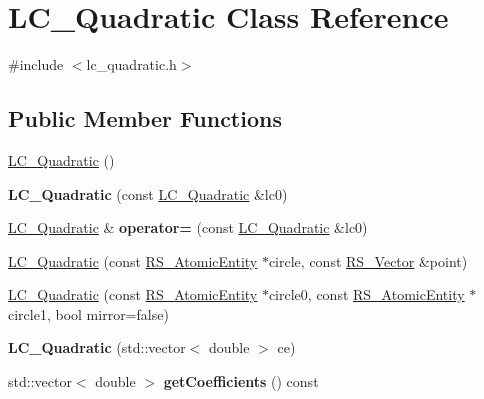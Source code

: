 \hypertarget{classLC__Quadratic}{\section{L\-C\-\_\-\-Quadratic Class Reference}
\label{classLC__Quadratic}
}


{\ttfamily \#include $<$lc\-\_\-quadratic.\-h$>$}

\subsection*{Public Member Functions}
\begin{DoxyCompactItemize}
\item 
\hyperlink{classLC__Quadratic_a3f76768a3e40df14b4e495219dd2ee09}{L\-C\-\_\-\-Quadratic} ()
\item 
\hypertarget{classLC__Quadratic_afc73fea931c40aa1b7277de86ac136b8}{{\bfseries L\-C\-\_\-\-Quadratic} (const \hyperlink{classLC__Quadratic}{L\-C\-\_\-\-Quadratic} \&lc0)}\label{classLC__Quadratic_afc73fea931c40aa1b7277de86ac136b8}

\item 
\hypertarget{classLC__Quadratic_afee130a8cc00c41f72e1bfdf98d4afe4}{\hyperlink{classLC__Quadratic}{L\-C\-\_\-\-Quadratic} \& {\bfseries operator=} (const \hyperlink{classLC__Quadratic}{L\-C\-\_\-\-Quadratic} \&lc0)}\label{classLC__Quadratic_afee130a8cc00c41f72e1bfdf98d4afe4}

\item 
\hyperlink{classLC__Quadratic_aa418f98f97745e37df1420d4cec12a3f}{L\-C\-\_\-\-Quadratic} (const \hyperlink{classRS__AtomicEntity}{R\-S\-\_\-\-Atomic\-Entity} $\ast$circle, const \hyperlink{classRS__Vector}{R\-S\-\_\-\-Vector} \&point)
\item 
\hyperlink{classLC__Quadratic_a65ce323828221a324686ac1997b7a85a}{L\-C\-\_\-\-Quadratic} (const \hyperlink{classRS__AtomicEntity}{R\-S\-\_\-\-Atomic\-Entity} $\ast$circle0, const \hyperlink{classRS__AtomicEntity}{R\-S\-\_\-\-Atomic\-Entity} $\ast$circle1, bool mirror=false)
\item 
\hypertarget{classLC__Quadratic_ad19eab8d5a8225ef833a04a719ada613}{{\bfseries L\-C\-\_\-\-Quadratic} (std\-::vector$<$ double $>$ ce)}\label{classLC__Quadratic_ad19eab8d5a8225ef833a04a719ada613}

\item 
\hypertarget{classLC__Quadratic_a98846919ea8a517e1e29b0f091575e5f}{std\-::vector$<$ double $>$ {\bfseries get\-Coefficients} () const }\label{classLC__Quadratic_a98846919ea8a517e1e29b0f091575e5f}


\end{DoxyCompactItemize}
